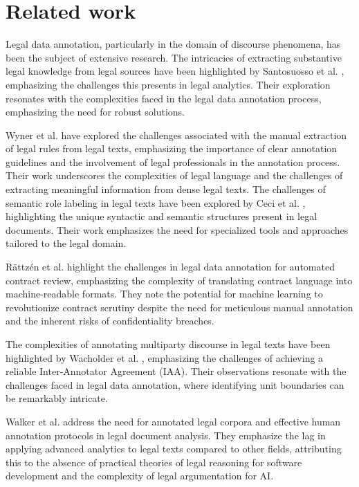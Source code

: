 \documentclass{IOS-Book-Article}
\begin{document}
\section{Related work}
Legal data annotation, particularly in the domain of discourse phenomena, has been the subject of extensive research. The intricacies of extracting substantive legal knowledge from legal sources have been highlighted by Santosuosso et al. \cite{r1}, emphasizing the challenges this presents in legal analytics. Their exploration resonates with the complexities faced in the legal data annotation process, emphasizing the need for robust solutions.

Wyner et al. \cite{r2} have explored the challenges associated with the manual extraction of legal rules from legal texts, emphasizing the importance of clear annotation guidelines and the involvement of legal professionals in the annotation process. Their work underscores the complexities of legal language and the challenges of extracting meaningful information from dense legal texts.
The challenges of semantic role labeling in legal texts have been explored by Ceci et al. \cite{r3}, highlighting the unique syntactic and semantic structures present in legal documents. Their work emphasizes the need for specialized tools and approaches tailored to the legal domain.

Rättzén et al. \cite{r4} highlight the challenges in legal data annotation for automated contract review, emphasizing the complexity of translating contract language into machine-readable formats. They note the potential for machine learning to revolutionize contract scrutiny despite the need for meticulous manual annotation and the inherent risks of confidentiality breaches.

The complexities of annotating multiparty discourse in legal texts have been highlighted by Wacholder et al. \cite{r5}, emphasizing the challenges of achieving a reliable Inter-Annotator Agreement (IAA). Their observations resonate with the challenges faced in legal data annotation, where identifying unit boundaries can be remarkably intricate.

Walker et al. \cite{r6} address the need for annotated legal corpora and effective human annotation protocols in legal document analysis. They emphasize the lag in applying advanced analytics to legal texts compared to other fields, attributing this to the absence of practical theories of legal reasoning for software development and the complexity of legal argumentation for AI.
\end{document}
